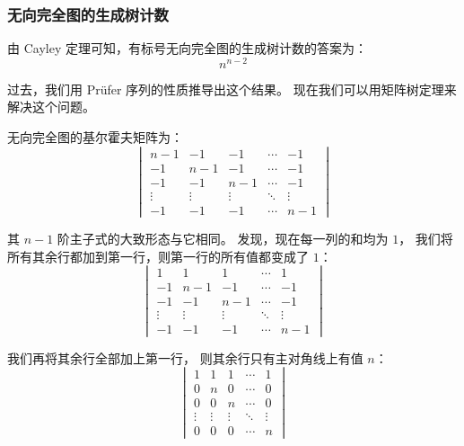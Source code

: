 \documentclass[UTF8]{article}
\begin{document}
	\subsubsection{无向完全图的生成树计数}

	由 Cayley 定理可知，有标号无向完全图的生成树计数的答案为：
	$$
	n^{n - 2}
	$$

	过去，我们用 Prüfer 序列的性质推导出这个结果。
	现在我们可以用矩阵树定理来解决这个问题。

	\bigskip

	无向完全图的基尔霍夫矩阵为：
	\begin{equation*}
		\begin{vmatrix}
			n - 1 & -1 & -1 & \cdots & -1
			\\
			-1 & n - 1 & -1 & \cdots & -1
			\\
			-1 & -1 & n - 1 & \cdots & -1
			\\
			\vdots & \vdots & \vdots & \ddots & \vdots
			\\
			-1 & -1 & -1 & \cdots & n - 1
		\end{vmatrix}
	\end{equation*}

	其 $n - 1$ 阶主子式的大致形态与它相同。
	发现，现在每一列的和均为 $1$，
	我们将所有其余行都加到第一行，则第一行的所有值都变成了 $1$：
	\begin{equation*}
		\begin{vmatrix}
			1 & 1 & 1 & \cdots & 1
			\\
			-1 & n - 1 & -1 & \cdots & -1
			\\
			-1 & -1 & n - 1 & \cdots & -1
			\\
			\vdots & \vdots & \vdots & \ddots & \vdots
			\\
			-1 & -1 & -1 & \cdots & n - 1
		\end{vmatrix}
	\end{equation*}

	我们再将其余行全部加上第一行，
	则其余行只有主对角线上有值 $n$：
	\begin{equation*}
		\begin{vmatrix}
			1 & 1 & 1 & \cdots & 1
			\\
			0 & n & 0 & \cdots & 0
			\\
			0 & 0 & n & \cdots & 0
			\\
			\vdots & \vdots & \vdots & \ddots & \vdots
			\\
			0 & 0 & 0 & \cdots & n
		\end{vmatrix}
	\end{equation*}
\end{document}
